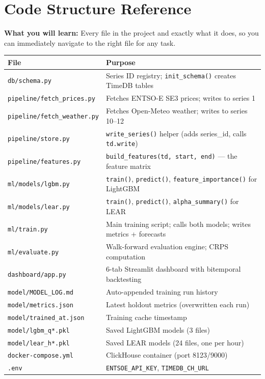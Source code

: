 \documentclass[12pt, a4paper, oneside]{memoir}
\newcommand{\code}[1]{\texttt{\footnotesize #1}}
\begin{document}
\chapter{Code Structure Reference}\label{ch:code}

\begin{chapterintro}
\sffamily\small\textbf{What you will learn:} Every file in the project and exactly
what it does, so you can immediately navigate to the right file for any task.
\end{chapterintro}

\begin{center}
\begin{tabularx}{\linewidth}{lX}
\toprule
\textbf{File} & \textbf{Purpose} \\
\midrule
\code{db/schema.py} & Series ID registry; \code{init\_schema()} creates TimeDB tables \\
\code{pipeline/fetch\_prices.py} & Fetches ENTSO-E SE3 prices; writes to series 1 \\
\code{pipeline/fetch\_weather.py} & Fetches Open-Meteo weather; writes to series 10--12 \\
\code{pipeline/store.py} & \code{write\_series()} helper (adds series\_id, calls \code{td.write}) \\
\code{pipeline/features.py} & \code{build\_features(td, start, end)} --- the feature matrix \\
\code{ml/models/lgbm.py} & \code{train()}, \code{predict()}, \code{feature\_importance()} for LightGBM \\
\code{ml/models/lear.py} & \code{train()}, \code{predict()}, \code{alpha\_summary()} for LEAR \\
\code{ml/train.py} & Main training script; calls both models; writes metrics + forecasts \\
\code{ml/evaluate.py} & Walk-forward evaluation engine; CRPS computation \\
\code{dashboard/app.py} & 6-tab Streamlit dashboard with bitemporal backtesting \\
\code{model/MODEL\_LOG.md} & Auto-appended training run history \\
\code{model/metrics.json} & Latest holdout metrics (overwritten each run) \\
\code{model/trained\_at.json} & Training cache timestamp \\
\code{model/lgbm\_q*.pkl} & Saved LightGBM models (3 files) \\
\code{model/lear\_h*.pkl} & Saved LEAR models (24 files, one per hour) \\
\code{docker-compose.yml} & ClickHouse container (port 8123/9000) \\
\code{.env} & \code{ENTSOE\_API\_KEY}, \code{TIMEDB\_CH\_URL} \\
\bottomrule
\end{tabularx}
\end{center}
\end{document}
